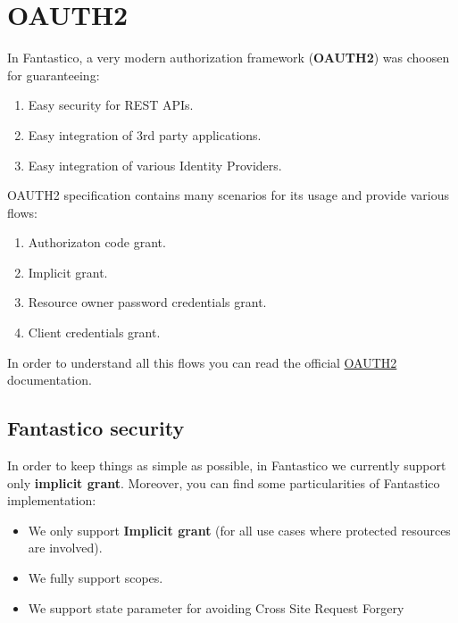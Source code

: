 \documentclass[letterpaper,10pt,english]{sphinxmanual}
\begin{document}
\section{OAUTH2}
\label{features/oauth2:oauth2}\label{features/oauth2::doc}
In Fantastico, a very modern authorization framework (\textbf{OAUTH2}) was choosen for guaranteeing:
\begin{enumerate}
\item {} 
Easy security for REST APIs.

\item {} 
Easy integration of 3rd party applications.

\item {} 
Easy integration of various Identity Providers.

\end{enumerate}

OAUTH2 specification contains many scenarios for its usage and provide various flows:
\begin{enumerate}
\item {} 
Authorizaton code grant.

\item {} 
Implicit grant.

\item {} 
Resource owner password credentials grant.

\item {} 
Client credentials grant.

\end{enumerate}

In order to understand all this flows you can read the official \href{http://tools.ietf.org/pdf/rfc6749.pdf}{OAUTH2}
documentation.


\subsection{Fantastico security}
\label{features/oauth2:fantastico-security}
In order to keep things as simple as possible, in Fantastico we currently support only \textbf{implicit grant}. Moreover,
you can find some particularities of Fantastico implementation:
\begin{itemize}
\item {} 
We only support \textbf{Implicit grant} (for all use cases where protected resources are involved).

\item {} 
We fully support scopes.

\item {} 
We support state parameter for avoiding Cross Site Request Forgery

\end{itemize}
\end{document}
